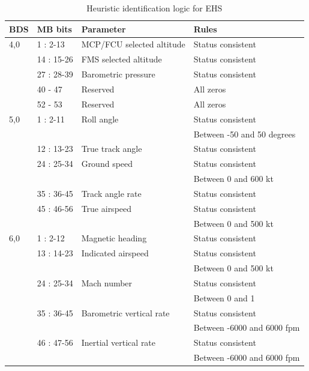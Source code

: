 \begin{table}
\footnotesize
\centering
\small
\caption{Heuristic identification logic for EHS}
\label{tb:bds_rule_ehs}
\begin{tabular}{|l|l|l|l|}
\hline
\textbf{BDS} & \textbf{MB bits} & \textbf{Parameter} & \textbf{Rules} \\ \hline \hline
4,0 & 1 : 2-13 & MCP/FCU selected altitude & Status consistent \\ \cline{2-4} 
& 14 : 15-26 & FMS selected altitude & Status consistent \\ \cline{2-4} 
& 27 : 28-39 & Barometric pressure & Status consistent \\ \cline{2-4} 
& 40 - 47 & Reserved & All zeros \\ \cline{2-4} 
& 52 - 53 & Reserved & All zeros \\ \hline \hline
5,0 & 1 : 2-11 & Roll angle & Status consistent \\ 
& & & Between -50 and 50 degrees \\ \cline{2-4} 
& 12 : 13-23 & True track angle & Status consistent \\ \cline{2-4} 
& 24 : 25-34 & Ground speed & Status consistent \\ 
& & & Between 0 and 600 kt \\ \cline{2-4} 
& 35 : 36-45 & Track angle rate & Status consistent \\ \cline{2-4} 
& 45 : 46-56 & True airspeed & Status consistent \\ 
& & & Between 0 and 500 kt \\ \hline \hline
6,0 & 1 : 2-12 & Magnetic heading & Status consistent \\ \cline{2-4} 
& 13 : 14-23 & Indicated airspeed & Status consistent \\ 
& & & Between 0 and 500 kt \\ \cline{2-4} 
& 24 : 25-34 & Mach number & Status consistent \\
& & & Between 0 and 1 \\ \cline{2-4} 
& 35 : 36-45 & Barometric vertical rate & Status consistent \\ 
& & & Between -6000 and 6000 fpm \\ \cline{2-4} 
& 46 : 47-56 & Inertial vertical rate & Status consistent \\ 
& & & Between -6000 and 6000 fpm \\ \hline
\end{tabular}
\end{table}


